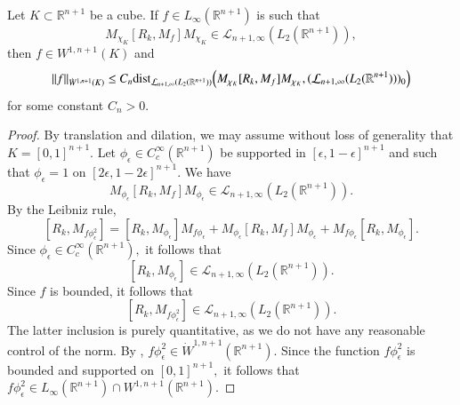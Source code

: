 \documentclass[12pt]{amsart}
\begin{document}
\begin{lemma}\label{second distance lemma} Let $K\subset\mathbb{R}^{n+1}$ be a cube. If $f\in L_{\infty}(\mathbb{R}^{n+1})$ is such that
$$M_{\chi_K}[R_k,M_f]M_{\chi_K}\in\mathcal{L}_{n+1,\infty}(L_2(\mathbb{R}^{n+1})),$$
then $f\in W^{1,n+1}(K)$ and
$$\|f\|_{\dot{W}^{1,n+1}(K)}\leq C_n{\rm dist}_{\mathcal{L}_{n+1,\infty}(L_2(\mathbb{R}^{n+1}))}\Big(M_{\chi_K}[R_k,M_f]M_{\chi_K},(\mathcal{L}_{n+1,\infty}(L_2(\mathbb{R}^{n+1})))_0\Big)$$
for some constant $C_n>0$.
\end{lemma}
\begin{proof} By translation and dilation, we may assume without loss of generality that $K=[0,1]^{n+1}.$ Let $\phi_{\epsilon}\in C^{\infty}_c(\mathbb{R}^{n+1})$ be supported in $[\epsilon,1-\epsilon]^{n+1}$ and such that $\phi_{\epsilon}=1$ on $[2\epsilon,1-2\epsilon]^{n+1}.$ We have
$$M_{\phi_{\epsilon}}[R_k,M_f]M_{\phi_{\epsilon}}\in\mathcal{L}_{n+1,\infty}(L_2(\mathbb{R}^{n+1})).$$
By the Leibniz rule,
$$[R_k,M_{f\phi_{\epsilon}^2}]=[R_k,M_{\phi_{\epsilon}}] M_{f\phi_{\epsilon}}+M_{\phi_{\epsilon}}[R_k,M_f]M_{\phi_{\epsilon}}+M_{f\phi_{\epsilon}} [R_k,M_{\phi_{\epsilon}}].$$
Since $\phi_{\epsilon}\in C^{\infty}_c(\mathbb{R}^{n+1}),$ it follows that
$$[R_k,M_{\phi_{\epsilon}}]\in\mathcal{L}_{n+1,\infty}(L_2(\mathbb{R}^{n+1})).$$
Since $f$ is bounded, it follows that
$$[R_k,M_{f\phi_{\epsilon}^2}]\in\mathcal{L}_{n+1,\infty}(L_2(\mathbb{R}^{n+1})).$$
The latter inclusion is purely quantitative, as we do not have any reasonable control of the norm. By \cite[Theorem 1]{LMSZ}, $f\phi_{\epsilon}^2\in \dot{W}^{1,n+1}(\mathbb{R}^{n+1}).$ Since the function $f\phi_{\epsilon}^2$ is bounded and supported on $[0,1]^{n+1},$ it follows that $f\phi_{\epsilon}^2\in L_{\infty}(\mathbb{R}^{n+1})\cap W^{1,n+1}(\mathbb{R}^{n+1}).$


\end{proof}
\end{document}
